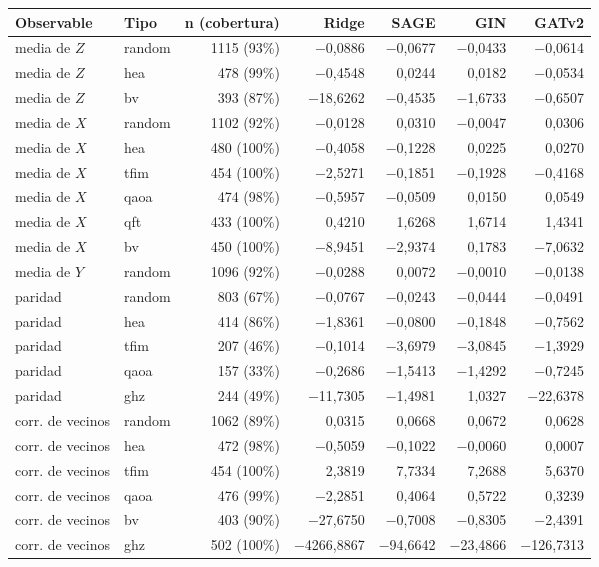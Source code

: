 \begin{table}[htbp]
    \centering
    {\footnotesize
    \begin{tabular}{@{}llrrrrr@{}}
        \toprule
        \textbf{Observable} & \textbf{Tipo} & \textbf{n (cobertura)} & \textbf{Ridge} & \textbf{SAGE} & \textbf{GIN} & \textbf{GATv2} \\
        \midrule
        media de $Z$ & random & 1115 (93\%) & $-$0,0886 & $-$0,0677 & $-$0,0433 & $-$0,0614 \\
        media de $Z$ & hea & 478 (99\%) & $-$0,4548 & 0,0244 & 0,0182 & $-$0,0534 \\
        media de $Z$ & bv & 393 (87\%) & $-$18,6262 & $-$0,4535 & $-$1,6733 & $-$0,6507 \\
        media de $X$ & random & 1102 (92\%) & $-$0,0128 & 0,0310 & $-$0,0047 & 0,0306 \\
        media de $X$ & hea & 480 (100\%) & $-$0,4058 & $-$0,1228 & 0,0225 & 0,0270 \\
        media de $X$ & tfim & 454 (100\%) & $-$2,5271 & $-$0,1851 & $-$0,1928 & $-$0,4168 \\
        media de $X$ & qaoa & 474 (98\%) & $-$0,5957 & $-$0,0509 & 0,0150 & 0,0549 \\
        media de $X$ & qft & 433 (100\%) & 0,4210 & 1,6268 & 1,6714 & 1,4341 \\
        media de $X$ & bv & 450 (100\%) & $-$8,9451 & $-$2,9374 & 0,1783 & $-$7,0632 \\
        media de $Y$ & random & 1096 (92\%) & $-$0,0288 & 0,0072 & $-$0,0010 & $-$0,0138 \\
        paridad & random & 803 (67\%) & $-$0,0767 & $-$0,0243 & $-$0,0444 & $-$0,0491 \\
        paridad & hea & 414 (86\%) & $-$1,8361 & $-$0,0800 & $-$0,1848 & $-$0,7562 \\
        paridad & tfim & 207 (46\%) & $-$0,1014 & $-$3,6979 & $-$3,0845 & $-$1,3929 \\
        paridad & qaoa & 157 (33\%) & $-$0,2686 & $-$1,5413 & $-$1,4292 & $-$0,7245 \\
        paridad & ghz & 244 (49\%) & $-$11,7305 & $-$1,4981 & 1,0327 & $-$22,6378 \\
        corr. de vecinos & random & 1062 (89\%) & 0,0315 & 0,0668 & 0,0672 & 0,0628 \\
        corr. de vecinos & hea & 472 (98\%) & $-$0,5059 & $-$0,1022 & $-$0,0060 & 0,0007 \\
        corr. de vecinos & tfim & 454 (100\%) & 2,3819 & 7,7334 & 7,2688 & 5,6370 \\
        corr. de vecinos & qaoa & 476 (99\%) & $-$2,2851 & 0,4064 & 0,5722 & 0,3239 \\
        corr. de vecinos & bv & 403 (90\%) & $-$27,6750 & $-$0,7008 & $-$0,8305 & $-$2,4391 \\
        corr. de vecinos & ghz & 502 (100\%) & $-$4266,8867 & $-$94,6642 & $-$23,4866 & $-$126,7313 \\
        \bottomrule
    \end{tabular}}


\end{table}
